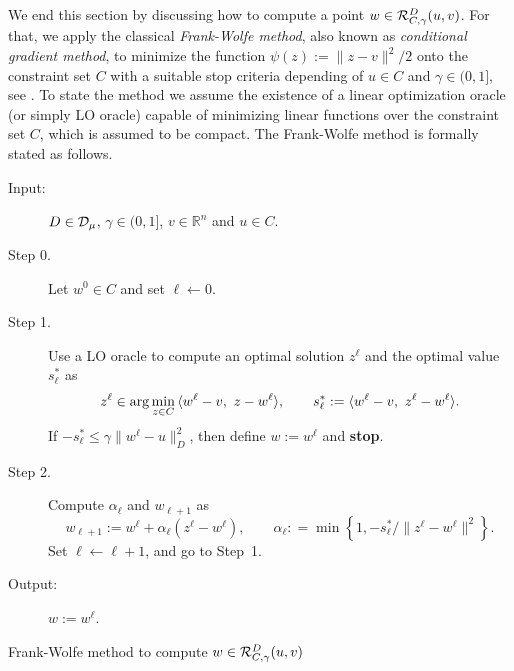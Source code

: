 We end this section by discussing how to compute a point $w\in{\cal R}_{C, \gamma}^{D}(u,v)$. For that, we apply the classical {\it Frank-Wolfe method}, also known as {\it conditional gradient method},   to minimize the function  $\psi(z) := \|z - v\|^2/2$ onto  the constraint set $C$ with  a suitable  stop criteria depending  of $u\in C$ and $\gamma \in (0, 1]$, see  \cite{BeckTeboulle2004, Jaggi2013}.  To state the method  we assume the existence of a linear optimization oracle (or simply LO oracle) capable of minimizing linear functions over the constraint set $C$,   which is assumed to be  compact. The   Frank-Wolfe method is  formally stated as follows.

\begin{algorithm}[H]
	\begin{description}
		\item[Input:]  $D\in {\cal D}_{\mu}$,  $\gamma \in (0, 1]$,  $v\in {\mathbb R}^n$ and   $u \in C$.
		\item[ Step 0.] Let $w^0\in  C$ and  set $\ell \gets 0$.
		\item[ Step 1.] Use a LO oracle to compute an optimal solution $z^\ell$ and the optimal value $s_{\ell}^*$ as
			\begin{equation}\label{eq:CondG_{C}}
				z^\ell \in  \arg\min_{z \in  C} \,\langle w^\ell-v, ~z-w^\ell\rangle,  \qquad s_{\ell}^*:=\langle  w^\ell-v, ~z^\ell-w^\ell \rangle.
			\end{equation}
			If $-s^*_{\ell}\leq \gamma \|w^{\ell}-u\|_{D}^2$, then define $w:=w^\ell$ and {\bf stop}.
		\item[ Step 2.]  Compute $\alpha_\ell$ and $w_{\ell+1}$ as
			\begin{equation}\label{eq:step size}
				w_{\ell+1}:=w^\ell+ \alpha_\ell(z^\ell-w^\ell), \qquad {\alpha}_\ell: =\min\left\{1, -s^*_{\ell}/\|z^\ell-w^\ell\|^2 \right\}.
			\end{equation}
			Set $\ell\gets \ell+1$, and go to Step~1.
		\item[Output:]   $w:=w^\ell$.
	\end{description}
	\caption{Frank-Wolfe  method to compute $w\in {\cal R}_{C, \gamma}^{D}(u,v)$}
	\label{Alg:CondG}
\end{algorithm}

